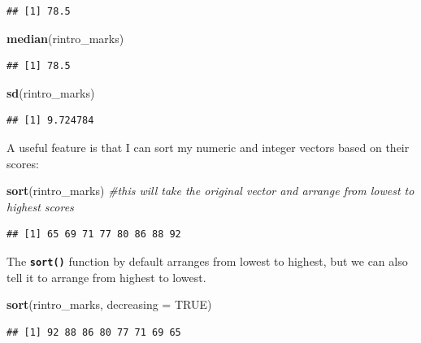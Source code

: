 \documentclass[
]{book}
\newenvironment{Shaded}{\begin{snugshade}}{\end{snugshade}}
\newcommand{\AttributeTok}[1]{\textcolor[rgb]{0.13,0.29,0.53}{#1}}
\newcommand{\CommentTok}[1]{\textcolor[rgb]{0.56,0.35,0.01}{\textit{#1}}}
\newcommand{\ConstantTok}[1]{\textcolor[rgb]{0.56,0.35,0.01}{#1}}
\newcommand{\FunctionTok}[1]{\textcolor[rgb]{0.13,0.29,0.53}{\textbf{#1}}}
\newcommand{\NormalTok}[1]{#1}
\begin{document}
\begin{verbatim}
## [1] 78.5
\end{verbatim}

\begin{Shaded}
\begin{Highlighting}[]
\FunctionTok{median}\NormalTok{(rintro\_marks)}
\end{Highlighting}
\end{Shaded}

\begin{verbatim}
## [1] 78.5
\end{verbatim}

\begin{Shaded}
\begin{Highlighting}[]
\FunctionTok{sd}\NormalTok{(rintro\_marks)}
\end{Highlighting}
\end{Shaded}

\begin{verbatim}
## [1] 9.724784
\end{verbatim}

A useful feature is that I can sort my numeric and integer vectors based on their scores:

\begin{Shaded}
\begin{Highlighting}[]
\FunctionTok{sort}\NormalTok{(rintro\_marks) }\CommentTok{\#this will take the original vector and arrange from lowest to highest scores}
\end{Highlighting}
\end{Shaded}

\begin{verbatim}
## [1] 65 69 71 77 80 86 88 92
\end{verbatim}

The \textbf{\texttt{sort()}} function by default arranges from lowest to highest, but we can also tell it to arrange from highest to lowest.

\begin{Shaded}
\begin{Highlighting}[]
\FunctionTok{sort}\NormalTok{(rintro\_marks, }\AttributeTok{decreasing =} \ConstantTok{TRUE}\NormalTok{) }
\end{Highlighting}
\end{Shaded}

\begin{verbatim}
## [1] 92 88 86 80 77 71 69 65
\end{verbatim}
\end{document}
